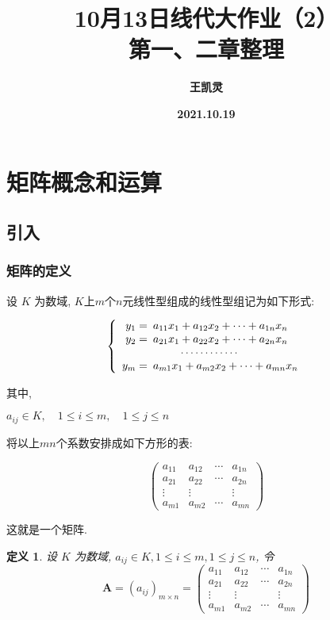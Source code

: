 \documentclass{article}
\title{\textbf{
		\zihao{1}10月13日线代大作业（2）\\
		\zihao{2}第一、二章整理}}
\author{\textbf{王凯灵}}
\date{\textbf{2021.10.19}}
\newtheorem{mydef}{定义}
\begin{document}
	\maketitle

	\section{矩阵概念和运算}

		\subsection{引入}

			\subsubsection{矩阵的定义}

设 $K$ 为数域, $K$上$m$个$n$元线性型组成的线性型组记为如下形式:

$$
\begin{aligned}
	\left\{\begin{array}{rl}
		y_{1}=&\hspace{-0.5em} a_{11} x_{1}+a_{12} x_{2}+\cdots+a_{1 n} x_{n} \\
		y_{2}=&\hspace{-0.5em} a_{21} x_{1}+a_{22} x_{2}+\cdots+a_{2 n} x_{n} \\
		&\qquad \cdots \cdots \cdots \cdots \\
		y_{m}=&\hspace{-0.5em} a_{m 1} x_{1}+a_{m 2} x_{2}+\cdots+a_{m n} x_{n} \\
	\end{array}\right.
\end{aligned}
$$

其中,

\centerline{$a_{i j} \in K, \quad 1 \leq i \leq m, \quad 1 \leq j \leq n$}

将以上$mn$个系数安排成如下方形的表:

$$
\left(\begin{array}{cccc}
	a_{11} & a_{12} & \cdots & a_{1 n} \\
	a_{21} & a_{22} & \cdots & a_{2 n} \\
	\vdots & \vdots & & \vdots \\
	a_{m 1} & a_{m 2} & \cdots & a_{m n}
\end{array}\right)
$$

这就是一个矩阵.

\begin{mydef}
	设 $K$ 为数域, $a_{i j} \in K, 1 \leq i \leq m, 1 \leq j \leq n$, 令
	$$
	\boldsymbol{A}=\left(a_{i j}\right)_{m \times n}=
	\left(\begin{array}{cccc}
		a_{11} & a_{12} & \cdots & a_{1 n} \\
		a_{21} & a_{22} & \cdots & a_{2 n} \\
		\vdots & \vdots & & \vdots \\
		a_{m 1} & a_{m 2} & \cdots & a_{m n}
	\end{array}\right)
	$$
\end{mydef}
\end{document}
